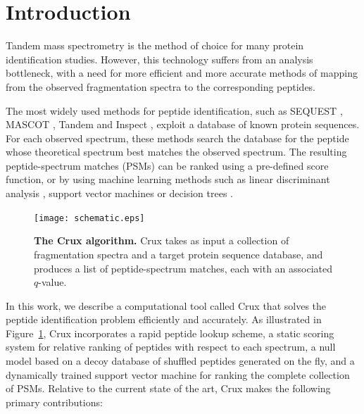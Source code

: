 \documentclass{bioinfo}
\begin{document}
\section{Introduction}

Tandem mass spectrometry is the method of choice for many protein
identification studies.  However, this technology suffers from an
analysis bottleneck, with a need for more efficient and more accurate
methods of mapping from the observed fragmentation spectra to the
corresponding peptides.

The most widely used methods for peptide identification, such as
SEQUEST \cite{eng:approach}, MASCOT \cite{FIXME}, Tandem \cite{FIXME}
and Inspect \cite{FIXME}, exploit a database of known protein
sequences.  For each observed spectrum, these methods search the
database for the peptide whose theoretical spectrum best matches the
observed spectrum.  The resulting peptide-spectrum matches (PSMs) can
be ranked using a pre-defined score function, or by using machine
learning methods such as linear discriminant analysis
\cite{keller:empirical}, support vector machines \cite{anderson:new,
kall:semi-supervised} or decision trees \cite{elias:intensity}.

\begin{figure}
\centering
\texttt{[image: schematic.eps]}
\caption{{\bf The Crux algorithm.}  Crux takes as input a collection
  of fragmentation spectra and a target protein sequence database, and
  produces a list of peptide-spectrum matches, each with an associated
  $q$-value.
  \label{figure:crux}}
\end{figure}

In this work, we describe a computational tool called Crux that solves
the peptide identification problem efficiently and accurately.  As
illustrated in Figure~\ref{figure:crux}, Crux incorporates a rapid
peptide lookup scheme, a static scoring system for relative ranking of
peptides with respect to each spectrum, a null model based on a decoy
database of shuffled peptides generated on the fly, and a dynamically
trained support vector machine for ranking the complete collection of
PSMs.  Relative to the current state of the art, Crux makes the
following primary contributions:
\end{document}
